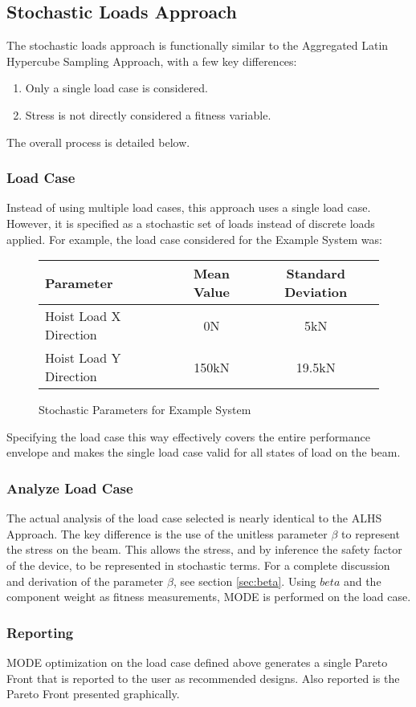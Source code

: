 \subsection{Stochastic Loads Approach}
The stochastic loads approach is functionally similar to the Aggregated Latin Hypercube Sampling Approach, with a few key differences: 

\begin{enumerate}
\item Only a single load case is considered. 
\item Stress is not directly considered a fitness variable. 
\end{enumerate}
The overall process is detailed below. 

\subsubsection{Load Case}
Instead of using multiple load cases, this approach uses a single load case. However, it is specified as a stochastic set of loads instead of discrete loads applied. For example, the load case considered for the Example System was:

\begin{figure}[!h]
    \begin{center}
    \begin{tabular}{|l|cc|}
	    \hline
	    Parameter & Mean Value & Standard Deviation\\
	    \hline
	    Hoist Load X Direction & 0N & 5kN\\
	    Hoist Load Y Direction & 150kN & 19.5kN\\
	    \hline
    \end{tabular}
    \caption{Stochastic Parameters for Example System}
    \label{fig:stoch_params}
    \end{center}
\end{figure}
Specifying the load case this way effectively covers the entire performance envelope and makes the single load case valid for all states of load on the beam. 

\subsubsection{Analyze Load Case}
The actual analysis of the load case selected is nearly identical to the ALHS Approach. The key difference is the use of the unitless parameter $\beta$ to represent the stress on the beam. This allows the stress, and by inference the safety factor of the device, to be represented in stochastic terms. For a complete discussion and derivation of the parameter $\beta$, see section \ref{sec:beta}. Using $beta$ and the component weight as fitness measurements, MODE is performed on the load case.

\subsubsection{Reporting}
MODE optimization on the load case defined above generates a single Pareto Front that is reported to the user as recommended designs. Also reported is the Pareto Front presented graphically. 
